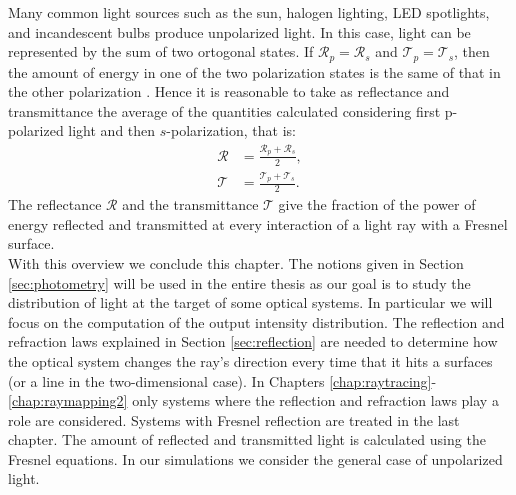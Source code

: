 \indent %
Many common light sources such as the sun, halogen lighting, LED spotlights, and incandescent bulbs produce unpolarized light. 
In this case, light can be represented by the sum of two ortogonal states. If $\mathcal{R}_p = \mathcal{R}_s$ and $\mathcal{T}_p = \mathcal{T}_s$, then the amount of energy in one of the two polarization states is the same of that in the other polarization \cite{hecht1998hecht}.
Hence it is reasonable to take as reflectance and transmittance the average of the quantities calculated considering first p-polarized light and then $s$-polarization, that is:
\begin{equation}\begin{split}
\mathcal{R} &= \frac{\mathcal{R}_p+ \mathcal{R}_s}{2},\\
\mathcal{T} &= \frac{\mathcal{T}_p+ \mathcal{T}_s}{2}.
\end{split}
\label{eq:RandTin2D}
\end{equation}
The reflectance $\mathcal{R}$ and the transmittance $\mathcal{T}$ give the fraction of the power of energy reflected and transmitted at every interaction of a light ray with a Fresnel surface.
 \\
\indent With this overview we conclude this chapter. The notions given in Section \ref{sec:photometry} will be used in the entire thesis as our goal is to study the distribution of light at the target of some optical systems. In particular we will focus on the computation of the output intensity distribution. The reflection and refraction laws explained in Section \ref{sec:reflection} are needed to determine how the optical system changes the ray's direction every time that it hits a surfaces (or a line in the two-dimensional case). In Chapters \ref{chap:raytracing}-\ref{chap:raymapping2} only systems where the reflection and refraction laws play a role are considered. Systems with Fresnel reflection are treated in the last chapter. The amount of reflected and transmitted light is calculated using the Fresnel equations. In our simulations we consider the general case of unpolarized light.
